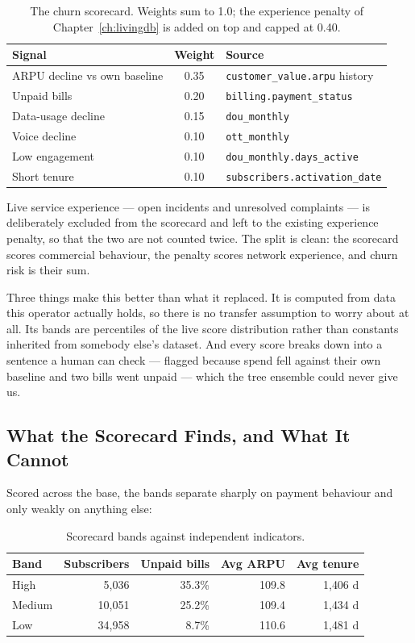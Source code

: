 \begin{table}[H]
\centering
\begin{tabular}{lcl}
\toprule
\textbf{Signal} & \textbf{Weight} & \textbf{Source} \\
\midrule
ARPU decline vs own baseline & 0.35 & \texttt{customer\_value.arpu} history \\
Unpaid bills                 & 0.20 & \texttt{billing.payment\_status} \\
Data-usage decline           & 0.15 & \texttt{dou\_monthly} \\
Voice decline                & 0.10 & \texttt{ott\_monthly} \\
Low engagement               & 0.10 & \texttt{dou\_monthly.days\_active} \\
Short tenure                 & 0.10 & \texttt{subscribers.activation\_date} \\
\bottomrule
\end{tabular}
\caption{The churn scorecard. Weights sum to 1.0; the experience penalty of
Chapter~\ref{ch:livingdb} is added on top and capped at 0.40.}
\label{tab:churn-heuristic}
\end{table}

Live service experience --- open incidents and unresolved complaints --- is
deliberately excluded from the scorecard and left to the existing experience
penalty, so that the two are not counted twice. The split is clean: the scorecard
scores commercial behaviour, the penalty scores network experience, and churn risk
is their sum.

Three things make this better than what it replaced. It is computed from data
this operator actually holds, so there is no transfer assumption to worry about
at all. Its bands are percentiles of the live score distribution rather than
constants inherited from somebody else's dataset. And every score breaks down
into a sentence a human can check --- flagged because spend fell against their
own baseline and two bills went unpaid --- which the tree ensemble could never
give us.

\subsection{What the Scorecard Finds, and What It Cannot}

Scored across the base, the bands separate sharply on payment behaviour and only
weakly on anything else:

\begin{table}[H]
\centering
\begin{tabular}{lrrrr}
\toprule
\textbf{Band} & \textbf{Subscribers} & \textbf{Unpaid bills} & \textbf{Avg ARPU} & \textbf{Avg tenure} \\
\midrule
High   & 5{,}036  & 35.3\% & 109.8 & 1{,}406 d \\
Medium & 10{,}051 & 25.2\% & 109.4 & 1{,}434 d \\
Low    & 34{,}958 &  8.7\% & 110.6 & 1{,}481 d \\
\bottomrule
\end{tabular}
\caption{Scorecard bands against independent indicators.}
\label{tab:churn-bands}
\end{table}

